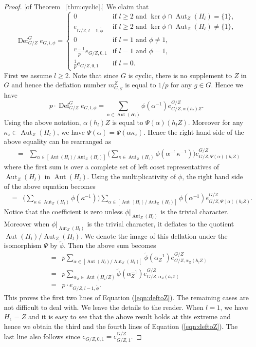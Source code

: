 \documentclass[12pt]{article}
\theoremstyle{plain}
\theoremstyle{definition}
\newcommand{\defl}{\operatorname{Def}}
\newcommand{\Aut}{\operatorname{Aut}}
\begin{document}
\begin{proof}{[of Theorem ~\ref{thm:cyclic}.]}
We claim that
\begin{equation}\label{eqn:deftoZ}
  \defl^G_{G/Z} e_{G, l, \phi} =\begin{cases}
              0 & \text{if } l\ge 2 \text{ and }\ker\phi\cap \Aut_Z(H_l) = \{1\},\\
            e_{G/Z, l-1, \tilde\phi} & \text{if } l\ge 2 \text{ and }\ker\phi\cap \Aut_Z(H_l) \not = \{1\},\\
                          0 & \text{if } l = 1 \text{ and }\phi \not = 1,\\
            \frac{p-1}{p}e_{G/Z, 0, 1} & \text{if } l = 1 \text{ and } \phi = 1,\\
            \frac{1}{p}e_{G/Z, 0, 1} & \text{if } l = 0.
          \end{cases}
\end{equation}
First we assume $l\ge 2$. Note that since $G$ is cyclic, there is no supplement to $Z$ in $G$ and hence the deflation number $m_{G, g}^Z$ is equal to $1/p$ for any $g\in G$. Hence we have
\[
p\cdot \defl^G_{G/Z} e_{G, l, \phi} = \sum_{\alpha\in\Aut(H_l)}\phi(\alpha^{-1}) e_{G/Z, \alpha(h_l)Z}^{G/Z}.
\]
Using the above notation, $\alpha(h_l)Z$ is equal to $\Psi(\alpha)(h_lZ)$. Moreover for any $\kappa_z\in\Aut_Z(H_l)$, we have $\Psi(\alpha) = \Psi(\alpha\kappa_z)$. Hence the right hand side of the above equality can be rearranged as
\begin{eqnarray*}
&=& \sum_{\alpha\in [\Aut(H_l)/\Aut_Z(H_l)]} \Big(\sum_{\kappa\in\Aut_Z(H_l)}\phi(\alpha^{-1}\kappa^{-1})\Big) e_{G/Z, \Psi(\alpha)(h_lZ)}^{G/Z}
\end{eqnarray*}
where the first sum is over a complete set of left coset representatives of $\Aut_Z(H_l)$ in $\Aut(H_l)$. Using the multiplicativity of $\phi$, the right hand side of the above equation becomes
\begin{eqnarray*}
&=& \Big(\sum_{\kappa\in\Aut_Z(H_l)}\phi(\kappa^{-1})\Big)\sum_{\alpha\in [\Aut(H_l)/\Aut_Z(H_l)]} \phi(\alpha^{-1}) e_{G/Z, \Psi(\alpha)(h_lZ)}^{G/Z}.
\end{eqnarray*}
Notice that the coefficient is zero unless $\phi|_{\Aut_Z(H_l)}$ is the trivial character. Moreover when $\phi|_{\Aut_Z(H_l)}$ is the trivial character, it deflates to the quotient $\Aut(H_l)/\Aut_Z(H_l)$. We denote the image of this deflation under the isomorphism $\Psi$ by $\tilde\phi$. Then the above sum becomes
\begin{eqnarray*}
&=& p\sum_{\alpha\in [\Aut(H_l)/\Aut_Z(H_l)]} \tilde\phi(\alpha^{-1}_Z) e_{G/Z, \alpha_Z(h_lZ)}^{G/Z}\\
&=& p\sum_{\alpha_Z\in \Aut(H_l/Z)} \tilde\phi(\alpha^{-1}_Z) e_{G/Z, \alpha_Z(h_lZ)}^{G/Z}\\
&=& p\cdot e_{G/Z, l-1, \tilde\phi}.
\end{eqnarray*}
This proves the first two lines of Equation (\ref{eqn:deftoZ}). The remaining cases are not difficult to deal with. We leave the details to the reader. When $l=1$, we have $H_1 = Z$ and it is easy to see that the above result holds at this extreme and hence we obtain the third and the fourth lines of Equation (\ref{eqn:deftoZ}). The last line also follows since $e_{G/Z, 0, 1} = e_{G/Z, 1}^{G/Z}$.


\end{proof}
\end{document}
